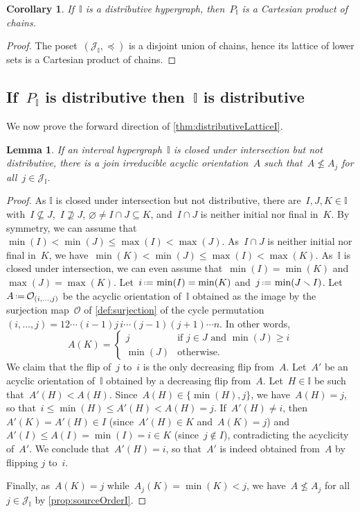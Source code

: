 \documentclass[reqno]{amsart}
\newtheorem{corollary}[theorem]{Corollary}
\newtheorem{lemma}[theorem]{Lemma}
\theoremstyle{definition}
\newcommand{\cal}[1]{\mathcal{#1}} %
\newcommand{\ssm}{\smallsetminus} %
\newcommand{\eqdef}{\mbox{\,\raisebox{0.2ex}{\scriptsize\ensuremath{\mathrm:}}\ensuremath{=}\,}} %
\newcommand{\Or}{\mathcal O}  %
\newcommand{\II}{\mathbb I} %
\newcommand{\cJ}{\cal{J}} %
\begin{document}
\begin{corollary}
If~$\II$ is a distributive hypergraph, then~$P_\II$ is a Cartesian product of chains.
\end{corollary}

\begin{proof}
The poset~$(\cJ_\II, \preccurlyeq)$ is a disjoint union of chains, hence its lattice of lower sets is a Cartesian product of chains.
\end{proof}


\subsection{If~$P_\II$ is distributive then~$\II$ is distributive}
\label{subsec:distributiveLatticeForward}

We now prove the forward direction of \cref{thm:distributiveLatticeI}.

\begin{lemma}
\label{lem:oneMoreIrreducible}
If an interval hypergraph~$\II$ is closed under intersection but not distributive, there is a join irreducible acyclic orientation~$A$ such that~$A \not\le A_j$ for all~$j \in \cJ_\II$.
\end{lemma}

\begin{proof}
As $\II$ is closed under intersection but not distributive, there are~$I,J,K \in \II$ with~$I \not\subseteq J$,~$I \not\supseteq J$, $\varnothing \ne I \cap J \subseteq K$, and~$I \cap J$ is neither initial nor final in~$K$.
By symmetry, we can assume that~$\min(I) < \min(J) \le \max(I) < \max(J)$. 
As~$I \cap J$ is neither initial nor final in~$K$, we have~$\min(K) < \min(J) \le \max(I) < \max(K)$.
As~$\II$ is closed under intersection, we can even assume that~$\min(I) = \min(K)$ and~$\max(J) = \max(K)$.
Let~$i \eqdef \min(I) = \min(K)$ and~$j \eqdef \min(J \ssm I)$.
Let~$A \eqdef \Or_{(i, \dots, j)}$ be the acyclic orientation of~$\II$ obtained as the image by the surjection map~$\Or$ of \cref{def:surjection} of the cycle permutation~$(i, \dots, j)  = 12 \cdots (i-1)j\, i \cdots (j-1) (j+1) \cdots n$.
In other words,
\[
A(K) = 
\begin{cases}
j & \text{if } j \in J \text{ and } \min(J) \ge i \\
\min(J) & \text{otherwise.}
\end{cases}
\]
We claim that the flip of~$j$ to~$i$ is the only decreasing flip from~$A$.
Let~$A'$ be an acyclic orientation of~$\II$ obtained by a decreasing flip from~$A$.
Let~$H \in \II$ be such that~$A'(H) < A(H)$.
Since~$A(H) \in \{\min(H), j\}$, we have~$A(H) = j$, so that~$i \le \min(H) \le A'(H) < A(H) = j$.
If~$A'(H) \ne i$, then~$A'(K) = A'(H) \in I$ (since~$A'(H) \in K$ and~$A(K) = j$) and $A'(I) \le A(I) = \min(I) = i \in K$ (since~$j \notin I$), contradicting the acyclicity of~$A'$.
We conclude that~$A'(H) = i$, so that~$A'$ is indeed obtained from~$A$ by flipping $j$ to~$i$.

Finally, as~$A(K) = j$ while~$A_j(K) = \min(K) < j$, we have~$A \not\le A_j$ for all~$j \in \cJ_\II$ by \cref{prop:sourceOrderI}.
\end{proof}
\end{document}
